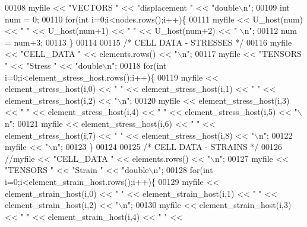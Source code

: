 \begin{DoxyCode}
00108         myfile << \textcolor{stringliteral}{"VECTORS "} << \textcolor{stringliteral}{"displacement "} << \textcolor{stringliteral}{"double\(\backslash\)n"};
00109         \textcolor{keywordtype}{int} num = 0;
00110         \textcolor{keywordflow}{for}(\textcolor{keywordtype}{int} i=0;i<nodes.rows();i++)\{
00111                 myfile << U\_host(num) << \textcolor{stringliteral}{" "} << U\_host(num+1) << \textcolor{stringliteral}{" "} << U\_host(num+2) << \textcolor{stringliteral}{" \(\backslash\)n"};
00112                 num = num+3;
00113         \}
00114 
00115         \textcolor{comment}{/* CELL DATA - STRESSES */}
00116         myfile << \textcolor{stringliteral}{"CELL\_DATA "} << elements.rows() << \textcolor{stringliteral}{"\(\backslash\)n"};
00117             myfile << \textcolor{stringliteral}{"TENSORS "} << \textcolor{stringliteral}{"Stress "} << \textcolor{stringliteral}{"double\(\backslash\)n"};
00118         \textcolor{keywordflow}{for}(\textcolor{keywordtype}{int} i=0;i<element\_stress\_host.rows();i++)\{
00119                 myfile << element\_stress\_host(i,0) << \textcolor{stringliteral}{" "} << element\_stress\_host(i,1) << \textcolor{stringliteral}{" "} << 
      element\_stress\_host(i,2) << \textcolor{stringliteral}{"\(\backslash\)n"};
00120                 myfile << element\_stress\_host(i,3) << \textcolor{stringliteral}{" "} << element\_stress\_host(i,4) << \textcolor{stringliteral}{" "} << 
      element\_stress\_host(i,5) << \textcolor{stringliteral}{"\(\backslash\)n"};
00121                 myfile << element\_stress\_host(i,6) << \textcolor{stringliteral}{" "} << element\_stress\_host(i,7) << \textcolor{stringliteral}{" "} << 
      element\_stress\_host(i,8) << \textcolor{stringliteral}{"\(\backslash\)n"};
00122                 myfile << \textcolor{stringliteral}{"\(\backslash\)n"};
00123         \}
00124 
00125         \textcolor{comment}{/* CELL DATA - STRAINS */}
00126         \textcolor{comment}{//myfile << "CELL\_DATA " << elements.rows() << "\(\backslash\)n";}
00127             myfile << \textcolor{stringliteral}{"TENSORS "} << \textcolor{stringliteral}{"Strain "} << \textcolor{stringliteral}{"double\(\backslash\)n"};
00128         \textcolor{keywordflow}{for}(\textcolor{keywordtype}{int} i=0;i<element\_strain\_host.rows();i++)\{
00129                 myfile << element\_strain\_host(i,0) << \textcolor{stringliteral}{" "} << element\_strain\_host(i,1) << \textcolor{stringliteral}{" "} << 
      element\_strain\_host(i,2) << \textcolor{stringliteral}{"\(\backslash\)n"};
00130                 myfile << element\_strain\_host(i,3) << \textcolor{stringliteral}{" "} << element\_strain\_host(i,4) << \textcolor{stringliteral}{" "} << 

\end{DoxyCode}
